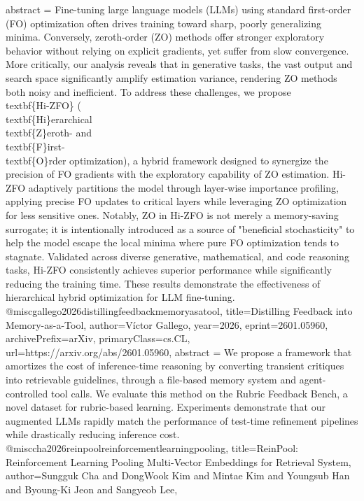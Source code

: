 {      abstract = {Fine-tuning large language models (LLMs) using standard first-order (FO) optimization often drives training toward sharp, poorly generalizing minima. Conversely, zeroth-order (ZO) methods offer stronger exploratory behavior without relying on explicit gradients, yet suffer from slow convergence. More critically, our analysis reveals that in generative tasks, the vast output and search space significantly amplify estimation variance, rendering ZO methods both noisy and inefficient. To address these challenges, we propose \\textbf\{Hi-ZFO\} (\\textbf\{Hi\}erarchical \\textbf\{Z\}eroth- and \\textbf\{F\}irst-\\textbf\{O\}rder optimization), a hybrid framework designed to synergize the precision of FO gradients with the exploratory capability of ZO estimation. Hi-ZFO adaptively partitions the model through layer-wise importance profiling, applying precise FO updates to critical layers while leveraging ZO optimization for less sensitive ones. Notably, ZO in Hi-ZFO is not merely a memory-saving surrogate; it is intentionally introduced as a source of "beneficial stochasticity" to help the model escape the local minima where pure FO optimization tends to stagnate. Validated across diverse generative, mathematical, and code reasoning tasks, Hi-ZFO consistently achieves superior performance while significantly reducing the training time. These results demonstrate the effectiveness of hierarchical hybrid optimization for LLM fine-tuning.}
}@misc{gallego2026distillingfeedbackmemoryasatool,
      title={Distilling Feedback into Memory-as-a-Tool}, 
      author={Víctor Gallego},
      year={2026},
      eprint={2601.05960},
      archivePrefix={arXiv},
      primaryClass={cs.CL},
      url={https://arxiv.org/abs/2601.05960},
      abstract = {We propose a framework that amortizes the cost of inference-time reasoning by converting transient critiques into retrievable guidelines, through a file-based memory system and agent-controlled tool calls. We evaluate this method on the Rubric Feedback Bench, a novel dataset for rubric-based learning. Experiments demonstrate that our augmented LLMs rapidly match the performance of test-time refinement pipelines while drastically reducing inference cost.}
}@misc{cha2026reinpoolreinforcementlearningpooling,
      title={ReinPool: Reinforcement Learning Pooling Multi-Vector Embeddings for Retrieval System}, 
      author={Sungguk Cha and DongWook Kim and Mintae Kim and Youngsub Han and Byoung-Ki Jeon and Sangyeob Lee},
}
